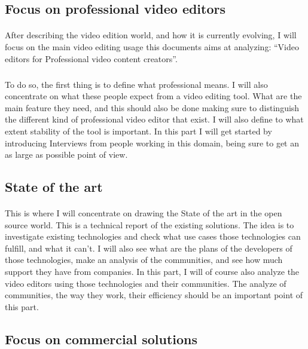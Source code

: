     \subsection{Focus on professional video editors}
        \paragraph{}
            After describing the video edition world, and how it is currently
            evolving, I will focus on the main video editing usage this documents
            aims at analyzing: ``Video editors for Professional video content
            creators''.

       \subparagraph{}
            To do so, the first thing is to define what professional means. I will
            also concentrate on what these people expect from a video editing tool.
            What are the main feature they need, and this should also be done
            making sure to distinguish the different kind of professional video
            editor that exist. I will also define to what extent stability of the
            tool is important. In this part I will get started by introducing
            Interviews from people working in this domain, being sure to get an
            as large as possible point of view.

    \subsection{State of the art}
       \paragraph{}
            This is where I will concentrate on drawing the State of the art in
            the open source world. This is a  technical report of the existing
            solutions.  The idea is to investigate existing technologies and
            check what use cases those technologies can fulfill, and what it
            can't. I will also see what are the plans of the developers of
            those technologies, make an analysis of the communities, and see
            how much support they have from companies. In this part, I will of
            course also analyze the video editors using those technologies and
            their communities. The analyze of communities, the way they work,
            their efficiency should be an important point of this part.

    \subsection{Focus on commercial solutions}
